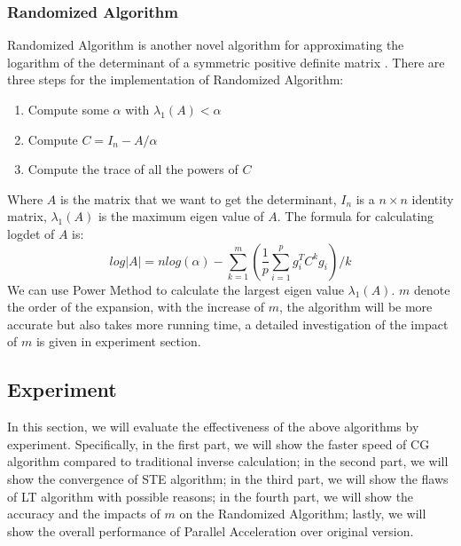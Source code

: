\documentclass{article}
\begin{document}
\subsubsection{Randomized Algorithm}
Randomized Algorithm is another novel algorithm for approximating the logarithm of the determinant of a symmetric positive definite matrix \cite{14}. There are three steps for the implementation of Randomized Algorithm:
\begin{enumerate}
	\item Compute some $\alpha$ with $\lambda_1(A)<\alpha$
	\item Compute $C=I_n-A/\alpha$
	\item Compute the trace of all the powers of $C$ 
\end{enumerate}
Where $A$ is the matrix that we want to get the determinant, $I_n$ is a $n\times n$ identity matrix, $\lambda_1(A)$ is the maximum eigen value of $A$. The formula for calculating logdet of $A$ is:
\begin{equation}
log|A|=nlog(\alpha)-\sum_{k=1}^{m}(\frac{1}{p}\sum_{i=1}^{p}g_i^TC^kg_i)/k
\end{equation}
We can use Power Method to calculate the largest eigen value $\lambda_1(A)$. $m$ denote the order of the expansion, with the increase of $m$, the algorithm will be more accurate but also takes more running time, a detailed investigation of the impact of $m$ is given in experiment section.




\subsection{Experiment}
In this section, we will evaluate the effectiveness of the above algorithms by experiment. Specifically, in the first part, we will show the faster speed of CG algorithm compared to traditional inverse calculation; in the second part, we will show the convergence of STE algorithm; in the third part, we will show the flaws of LT algorithm with possible reasons; in the fourth part, we will show the accuracy and the impacts of $m$ on the Randomized Algorithm; lastly, we will show the overall performance of Parallel Acceleration over original version.
\end{document}
